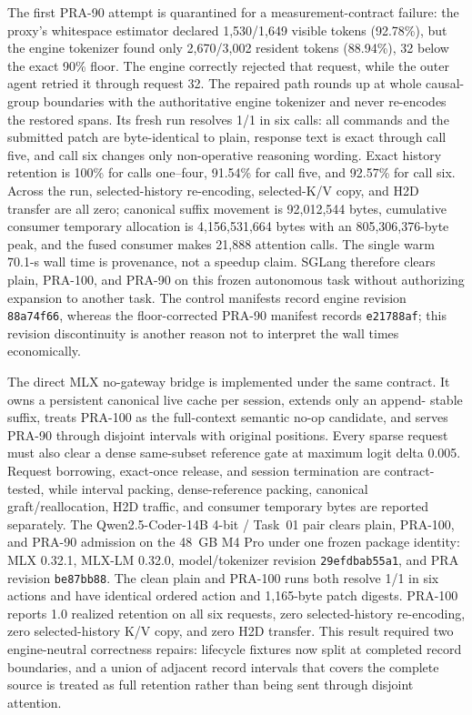 \documentclass[11pt]{article}
\begin{document}
The first PRA-90 attempt is quarantined for a measurement-contract failure:
the proxy's whitespace estimator declared 1,530/1,649 visible tokens (92.78\%),
but the engine tokenizer found only 2,670/3,002 resident tokens (88.94\%), 32
below the exact 90\% floor.  The engine correctly rejected that request, while
the outer agent retried it through request 32.  The repaired path rounds up at
whole causal-group boundaries with the authoritative engine tokenizer and
never re-encodes the restored spans.  Its fresh run resolves 1/1 in six calls:
all commands and the submitted patch are byte-identical to plain, response text
is exact through call five, and call six changes only non-operative reasoning
wording.  Exact history retention is 100\% for calls one--four, 91.54\% for
call five, and 92.57\% for call six.  Across the run, selected-history
re-encoding, selected-K/V copy, and H2D transfer are all zero; canonical suffix
movement is 92,012,544 bytes, cumulative consumer temporary allocation is
4,156,531,664 bytes with an 805,306,376-byte peak, and the fused consumer makes
21,888 attention calls.  The single warm 70.1-s wall time is provenance, not a
speedup claim.  SGLang therefore clears plain, PRA-100, and PRA-90 on this
frozen autonomous task without authorizing expansion to another task.
The control manifests record engine revision \texttt{88a74f66}, whereas the
floor-corrected PRA-90 manifest records \texttt{e21788af}; this revision
discontinuity is another reason not to interpret the wall times economically.

The direct MLX no-gateway bridge is implemented under the same contract.
It owns a persistent canonical live cache per session, extends only an append-
stable suffix, treats PRA-100 as the full-context semantic no-op candidate, and
serves PRA-90 through disjoint intervals with original positions.  Every sparse
request must also clear a dense same-subset reference gate at maximum logit
delta 0.005.  Request borrowing, exact-once release, and session termination
are contract-tested, while interval packing, dense-reference packing,
canonical graft/reallocation, H2D traffic, and consumer temporary bytes are
reported separately.  The Qwen2.5-Coder-14B 4-bit / Task~01 pair clears plain,
PRA-100, and PRA-90 admission on the 48~GB M4 Pro under one frozen package
identity: MLX 0.32.1, MLX-LM 0.32.0, model/tokenizer revision
\texttt{29efdbab55a1}, and PRA revision \texttt{be87bb88}.  The clean plain and
PRA-100 runs both resolve 1/1 in six actions and have identical ordered action
and 1,165-byte patch digests.  PRA-100 reports 1.0 realized retention on all
six requests, zero selected-history re-encoding, zero selected-history K/V
copy, and zero H2D transfer.  This result required two engine-neutral
correctness repairs: lifecycle fixtures now split at completed record
boundaries, and a union of adjacent record intervals that covers the complete
source is treated as full retention rather than being sent through disjoint
attention.
\end{document}
